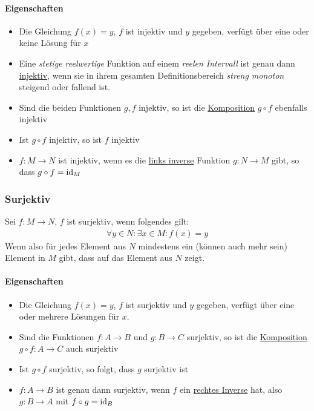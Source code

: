 \paragraph{Eigenschaften}
\begin{itemize}
	\item Die Gleichung $f(x) = y$, $f$ ist injektiv und $y$ gegeben, verfügt über eine oder keine Lösung für $x$
	\item Eine \textit{stetige reelwertige} Funktion auf einem \textit{reelen Intervall} ist genau dann \underline{injektiv}, wenn sie in ihrem gesamten Definitionsbereich \textit{streng monoton} steigend oder fallend ist.
	\item Sind die beiden Funktionen $g, f$ injektiv, so ist die \underline{Komposition} $g \circ f$ ebenfalls injektiv
	\item Ist $g \circ f$ injektiv, so ist $f$ injektiv
	\item $f: M \rightarrow N$ ist injektiv, wenn es die \underline{links inverse} Funktion $g: N \rightarrow M$ gibt, so dass $g \circ f = \operatorname{id}_M$
\end{itemize}

\subsubsection{Surjektiv}
Sei $f: M \rightarrow N$, $f$ ist surjektiv, wenn folgendes gilt:
\begin{align*}
\forall y \in N: \exists x \in M: f(x) = y
\end{align*}
Wenn also für jedes Element aus $N$ mindestens ein (können auch mehr sein) Element in $M$ gibt, dass auf das Element aus $N$ zeigt.


\paragraph{Eigenschaften}
\begin{itemize}
	\item Die Gleichung $f(x) = y$, $f$ ist surjektiv und $y$ gegeben, verfügt über eine oder mehrere Lösungen für $x$.
	\item Sind die Funktionen $f: A \rightarrow B$ und $g: B \rightarrow C$ surjektiv, so ist die \underline{Komposition} $g \circ f: A \rightarrow C$ auch surjektiv
	\item Ist $g \circ f$ surjektiv, so folgt, dass $g$ surjektiv ist
	\item $f: A \rightarrow B$ ist genau dann surjektiv, wenn $f$ ein \underline{rechtes Inverse} hat, also $g: B \rightarrow A$ mit $f \circ g = \operatorname{id}_B$
\end{itemize}

